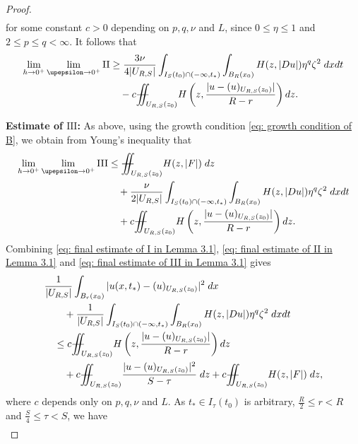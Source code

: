 \documentclass[11pt,oneside, english,reqno,twoside a4paper]{amsart}
\theoremstyle{definition}
\numberwithin{theorem}{section}
\numberwithin{equation}{section}
\newcommand{\iintss}{{\int\hspace{-0.28cm}\int}}
\newcommand{ \miints }{{\iintss\hspace{-0.56cm} -\hspace{-0.15cm}-}}
\newcommand{\miint}[1]{{\miints_{\hspace{-0.13cm}#1}}}
\begin{document}
\begin{proof}
\begin{align*}
    \end{align*}
    for some constant $c>0$ depending on $p,q,\nu$ and $L$, since $0\leq \eta \leq 1$ and $2 \leq p \leq q < \infty$. 
    It follows that 
    \begin{equation}\label{eq: final estimate of II in Lemma 3.1}
        \begin{aligned}
            \lim_{h\rightarrow 0^+}\lim_{\upepsilon \rightarrow 0^+} \mathrm{II} &\geq \frac{3\nu}{4|U_{R, S}|} \int_{I_S(t_0)\cap(-\infty,t_*)} \int_{B_R(x_0)} H(z,|Du|)\eta^q\zeta^2 \;dx dt\\
            &\quad -c\miint{U_{R,S}(z_0)} H\left(z,\frac{|u-(u)_{U_{R, S}(z_0)}|}{R-r}\right) dz.
        \end{aligned}
    \end{equation}

   \noindent\textbf{Estimate of $\mathrm{III}$:} As above, using the growth condition \eqref{eq: growth condition of B}, we obtain from Young's inequality that
    \begin{align}\nonumber
        \lim_{h\rightarrow 0^+}\lim_{\upepsilon \rightarrow 0^+} \mathrm{III} & \leq \miint{U_{R,S}(z_0)} H(z,|F|) \; dz\\ \nonumber
        &\quad +\frac{\nu}{2|U_{R, S}|} \int_{I_S(t_0)\cap(-\infty,t_*)} \int_{B_R(x_0)} H(z,|Du|)\eta^q \zeta^2 \;dx dt\\ \label{eq: final estimate of III in Lemma 3.1}
        &\quad +c\miint{U_{R,S}(z_0)} H\left(z,\frac{|u-(u)_{U_{R, S}(z_0)}|}{R-r}\right) dz.
    \end{align}
    Combining \eqref{eq: final estimate of I in Lemma 3.1}, \eqref{eq: final estimate of II in Lemma 3.1} and \eqref{eq: final estimate of III in Lemma 3.1} gives
    \begin{align*}
        &\frac{1}{|U_{R, S}|}\int_{B_r(x_0)} |u(x,t_*)-(u)_{U_{R, S}(z_0)}|^2\; dx\\
        &\qquad +\frac{1}{|U_{R, S}|} \int_{I_S(t_0)\cap(-\infty,t_*)} \int_{B_R(x_0)} H(z,|Du|)\eta^q\zeta^2 \;dx dt\\
        &\quad \leq c\miint{U_{R,S}(z_0)} H\left(z,\frac{|u-(u)_{U_{R, S}(z_0)}|}{R-r}\right) dz\\
        &\qquad + c \miint{U_{R,S}(z_0)}\frac{|u-(u)_{U_{R,S}(z_0)}|^2}{S-\tau} \; dz +c\miint{U_{R,S}(z_0)} H(z,|F|) \; dz,
    \end{align*}
    where $c$ depends only on $p,q,\nu$ and $L$. As $t_*\in I_\tau(t_0)$ is arbitrary, $\frac{R}{2}\leq r <R$ and $\frac{S}{4}\leq \tau < S$, we have
    \begin{align*}

\end{align*}
\end{proof}
\end{document}
